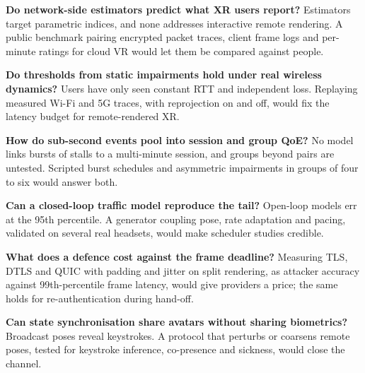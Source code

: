 \begin{openproblems}
\item \textbf{Do network-side estimators predict what XR users report?} Estimators target parametric
  indices, and none addresses interactive remote rendering. A public benchmark pairing encrypted packet
  traces, client frame logs and per-minute ratings for cloud VR would let them be compared against people.
\item \textbf{Do thresholds from static impairments hold under real wireless dynamics?} Users have only
  seen constant RTT and independent loss. Replaying measured Wi-Fi and 5G traces, with reprojection on and
  off, would fix the latency budget for remote-rendered XR.
\item \textbf{How do sub-second events pool into session and group QoE?} No model links bursts of stalls
  to a multi-minute session, and groups beyond pairs are untested. Scripted burst schedules and asymmetric
  impairments in groups of four to six would answer both.
\item \textbf{Can a closed-loop traffic model reproduce the tail?} Open-loop models err at the 95th
  percentile. A generator coupling pose, rate adaptation and pacing, validated on several real headsets,
  would make scheduler studies credible.
\item \textbf{What does a defence cost against the frame deadline?} Measuring TLS, DTLS and QUIC with
  padding and jitter on split rendering, as attacker accuracy against 99th-percentile frame latency, would
  give providers a price; the same holds for re-authentication during hand-off.
\item \textbf{Can state synchronisation share avatars without sharing biometrics?} Broadcast poses reveal
  keystrokes. A protocol that perturbs or coarsens remote poses, tested for keystroke inference,
  co-presence and sickness, would close the channel.
\end{openproblems}
